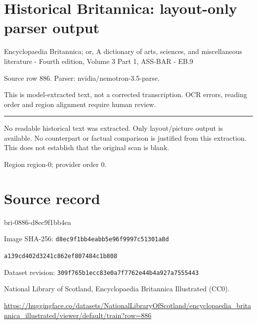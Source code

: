 \documentclass[11pt]{article}
\begin{document}
\section*{Historical Britannica: layout-only parser output}
Encyclopaedia Britannica; or, A dictionary of arts, sciences, and miscellaneous literature - Fourth edition, Volume 3 Part 1, ASS-BAR - EB.9\par
{\small Source row 886. Parser: nvidia/nemotron-3.5-parse.\par}
{\small This is model-extracted text, not a corrected transcription. OCR errors, reading order and region alignment require human review.\par}
\hrule\medskip
{\color{red} No readable historical text was extracted. Only layout/picture output is available. No counterpart or factual comparison is justified from this extraction. This does not establish that the original scan is blank.\par}


\par

{\scriptsize\color{gray} Region region-0; provider order 0.\par}
\medskip
\newpage\section*{Source record}
bri-0886-d8ec9f1bb4ea\par
Image SHA-256: \texttt{d8ec9f1bb4eabb5e96f9997c51301a8d}\par\texttt{a139cd402d3241c862ef807484c1b808}\par
Dataset revision: \texttt{309f765b1ecc83e0a7f7}\texttt{762e44b4a927a7555443}\par
National Library of Scotland, Encyclopaedia Britannica Illustrated (CC0).\par
\url{https://huggingface.co/datasets/NationalLibraryOfScotland/encyclopaedia_britannica_illustrated/viewer/default/train?row=886}
\end{document}
